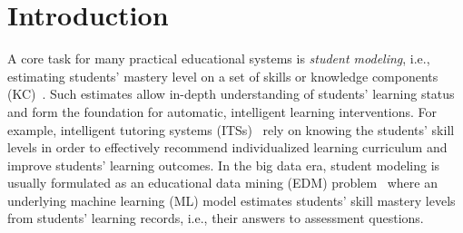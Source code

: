 \documentclass{edm_article}
\newcommand{\ml}[1]{\textcolor{orange}{\bf [LAN bandit: #1]}}
\newcommand{\jack}[1]{\textcolor{purple}{\bf [jack the ripper: #1]}}
\begin{document}
%


\flushbottom
\section{Introduction}
\label{sec:intro}
A core task for many practical educational systems is \textit{student modeling}, i.e., estimating students' mastery level on a set of skills or knowledge components (KC)~\cite{vanlehn1988student, chrysafiadi2013student}. Such estimates allow in-depth understanding of students' learning status and form the foundation for automatic, intelligent learning interventions.
For example, intelligent tutoring systems (ITSs)~\cite{shute1994intelligent, pls1,anderson1995cognitive,nye2014autotutor,heffernan2014assistments,rafferty2015inferring} rely on knowing the students' skill levels in order to effectively recommend individualized learning curriculum and improve students' learning outcomes. In the big data era, student modeling is usually formulated as an educational data mining (EDM) problem~\cite{romero2010educational,baker2009state,merceron2005educational} where an underlying machine learning (ML) model estimates students' skill mastery levels from students' learning records, i.e., their answers to assessment questions. 
\end{document}
